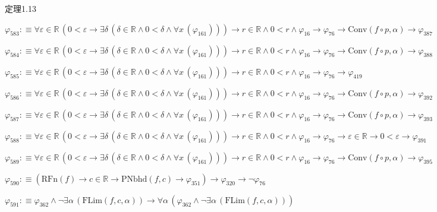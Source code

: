 \begin{fullproof}{定理1.13}
\begin{abbrevlist}
\item $\varphi_{583} :\equiv \forall \varepsilon \in \mathbb{R}\,(0 < \varepsilon \to \exists \delta\,(\delta \in \mathbb{R} \land 0 < \delta \land \forall x\,(\varphi_{161}))) \to r \in \mathbb{R} \land 0 < r \land \varphi_{16} \to \varphi_{76} \to \mathrm{Conv}(f \circ p,\alpha) \to \varphi_{387}$
\item $\varphi_{584} :\equiv \forall \varepsilon \in \mathbb{R}\,(0 < \varepsilon \to \exists \delta\,(\delta \in \mathbb{R} \land 0 < \delta \land \forall x\,(\varphi_{161}))) \to r \in \mathbb{R} \land 0 < r \land \varphi_{16} \to \varphi_{76} \to \mathrm{Conv}(f \circ p,\alpha) \to \varphi_{388}$
\item $\varphi_{585} :\equiv \forall \varepsilon \in \mathbb{R}\,(0 < \varepsilon \to \exists \delta\,(\delta \in \mathbb{R} \land 0 < \delta \land \forall x\,(\varphi_{161}))) \to r \in \mathbb{R} \land 0 < r \land \varphi_{16} \to \varphi_{76} \to \varphi_{419}$
\item $\varphi_{586} :\equiv \forall \varepsilon \in \mathbb{R}\,(0 < \varepsilon \to \exists \delta\,(\delta \in \mathbb{R} \land 0 < \delta \land \forall x\,(\varphi_{161}))) \to r \in \mathbb{R} \land 0 < r \land \varphi_{16} \to \varphi_{76} \to \mathrm{Conv}(f \circ p,\alpha) \to \varphi_{392}$
\item $\varphi_{587} :\equiv \forall \varepsilon \in \mathbb{R}\,(0 < \varepsilon \to \exists \delta\,(\delta \in \mathbb{R} \land 0 < \delta \land \forall x\,(\varphi_{161}))) \to r \in \mathbb{R} \land 0 < r \land \varphi_{16} \to \varphi_{76} \to \mathrm{Conv}(f \circ p,\alpha) \to \varphi_{393}$
\item $\varphi_{588} :\equiv \forall \varepsilon \in \mathbb{R}\,(0 < \varepsilon \to \exists \delta\,(\delta \in \mathbb{R} \land 0 < \delta \land \forall x\,(\varphi_{161}))) \to r \in \mathbb{R} \land 0 < r \land \varphi_{16} \to \varphi_{76} \to \varepsilon \in \mathbb{R} \to 0 < \varepsilon \to \varphi_{391}$
\item $\varphi_{589} :\equiv \forall \varepsilon \in \mathbb{R}\,(0 < \varepsilon \to \exists \delta\,(\delta \in \mathbb{R} \land 0 < \delta \land \forall x\,(\varphi_{161}))) \to r \in \mathbb{R} \land 0 < r \land \varphi_{16} \to \varphi_{76} \to \mathrm{Conv}(f \circ p,\alpha) \to \varphi_{395}$
\item $\varphi_{590} :\equiv (\mathrm{RFn}(f) \to c \in \mathbb{R} \to \mathrm{PNbhd}(f,c) \to \varphi_{351}) \to \varphi_{320} \to \neg \varphi_{76}$
\item $\varphi_{591} :\equiv \varphi_{362} \land \neg \exists \alpha\,(\mathrm{FLim}(f,c,\alpha)) \to \forall \alpha\,(\varphi_{362} \land \neg \exists \alpha\,(\mathrm{FLim}(f,c,\alpha)))$

\end{abbrevlist}
\end{fullproof}
